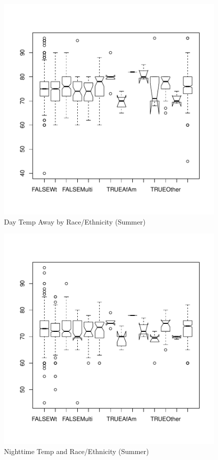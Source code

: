 \documentclass{article}
\begin{document}
\begin{figure}
\begin{center}
\caption{Day Temp Away by Race/Ethnicity (Summer)}
\label{fig:AwayRaceS}
\includegraphics{DraftEdwardsWoods-019}
\end{center}
\end{figure}


\begin{figure}
\begin{center}
\caption{Nighttime Temp and Race/Ethnicity (Summer)}
\label{fig:NightRaceS}
\includegraphics{DraftEdwardsWoods-020}
\end{center}
\end{figure}
  
\end{document}
